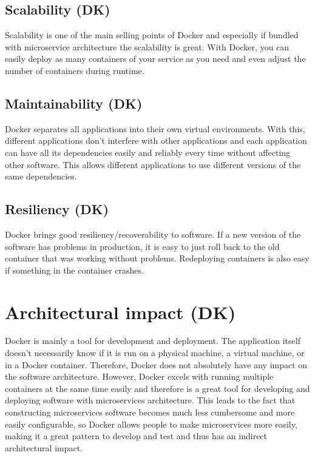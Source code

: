 \documentclass[fleqn,12pt]{olplainarticle}
\begin{document}
\subsection{Scalability (DK)}
Scalability is one of the main selling points of Docker and especially if bundled with microservice architecture the scalability is great. With Docker, you can easily deploy as many containers of your service as you need and even adjust the number of containers during runtime.

\subsection{Maintainability (DK)}
Docker separates all applications into their own virtual environments. With this, different applications don't interfere with other applications and each application can have all its dependencies easily and reliably every time without affecting other software. This allows different applications to use different versions of the same dependencies.

\subsection{Resiliency (DK)}
Docker brings good resiliency/recoverability to software. If a new version of the software has problems in production, it is easy to just roll back to the old 
container that was working without problems. Redeploying containers is also easy if something in the container crashes.

\section{Architectural impact (DK)}

Docker is mainly a tool for development and deployment. The application itself doesn't necessarily know if it is run on a physical machine, a virtual machine, or in a Docker container. Therefore, Docker does not absolutely have any impact on the software architecture. However, Docker excels with running multiple containers at the same time easily and therefore is a great tool for developing and deploying software with microservices architecture. This leads to the fact
that constructing microservices software becomes much less cumbersome and more easily configurable, so Docker allows people to make microservices more easily, making it a great pattern to develop and test and thus has an indirect architectural impact.
\end{document}
